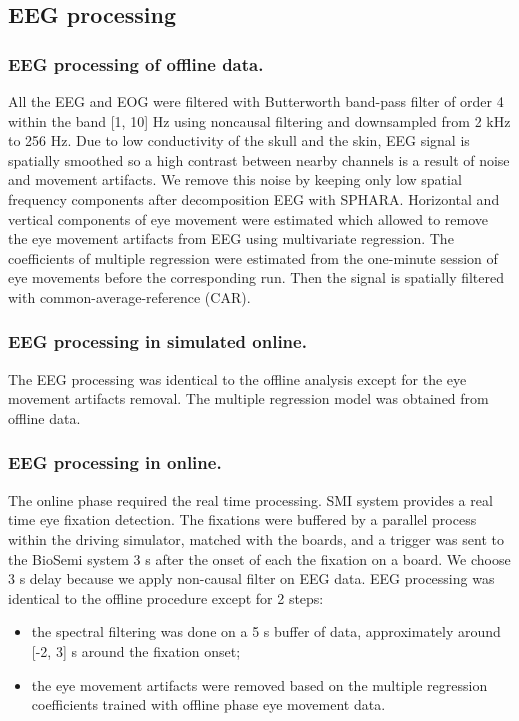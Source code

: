 \documentclass[12pt]{iopart}
\begin{document}
\subsection{EEG processing}
\subsubsection*{EEG processing of offline data.}
All the EEG and EOG were filtered with Butterworth band-pass filter
of order 4 within the band [1, 10] Hz
using noncausal filtering and downsampled from 2 kHz to 256 Hz.
Due to low conductivity of the skull and the skin,
EEG signal is spatially smoothed so a high contrast between nearby channels
is a result of noise and movement artifacts. We remove this noise
by keeping only low spatial frequency components after decomposition EEG with SPHARA.
Horizontal and vertical components of eye movement were estimated which allowed
to remove the eye movement artifacts from EEG using multivariate regression.
The coefficients of multiple regression were estimated from the 
one-minute session of eye movements before the corresponding run.
Then the signal is spatially
filtered with common-average-reference (CAR). 

\subsubsection*{EEG processing in simulated online.}
The EEG processing was identical to the offline analysis
except for the eye movement artifacts removal. The multiple regression
model was obtained from offline data.

\subsubsection*{EEG processing in online.}
The online phase required the real time processing. SMI system provides
a real time eye fixation detection. The fixations were buffered
by a parallel process within the driving simulator, matched with the boards,
and a trigger was sent to the BioSemi system 3 s after the onset of each the fixation
on a board. We choose 3 s delay because we apply non-causal filter on EEG data.
EEG processing  was identical to the offline procedure
except for 2 steps:
\begin{itemize}
    \item the spectral filtering was done on a 5 s buffer of data,
        approximately around [-2, 3] s around the fixation onset;
    \item the eye movement artifacts were removed based on the multiple
        regression coefficients trained with offline phase eye movement data.
\end{itemize}
\end{document}

